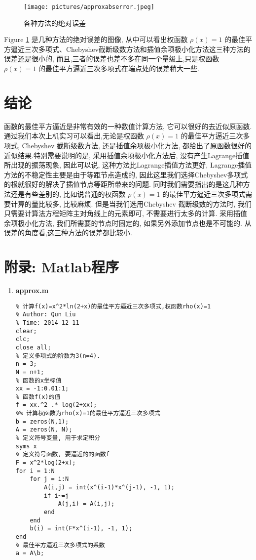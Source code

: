 \documentclass[a4paper]{article}
\begin{document}
\begin{spacing}{1.5}
\begin{CJK*}{GBK}{song}
\begin{figure}[!htbp]
\centering\texttt{[image: pictures/approxabserror.jpeg]}
\setlength{\abovecaptionskip}{0pt}
\caption{各种方法的绝对误差}\label{fig_err}
\setlength{\belowcaptionskip}{0pt}
\end{figure}
Figure \ref{fig_err} 是几种方法的绝对误差的图像, 从中可以看出权函数 $\rho(x)=1$ 的最佳平方逼近三次多项式、Chebyshev截断级数方法和插值余项极小化方法这三种方法的误差还是很小的, 而且,三者的误差也差不多在同一个量级上,只是权函数 $\rho(x)=1$ 的最佳平方逼近三次多项式在端点处的误差稍大一些.

\section{结论}
函数的最佳平方逼近是非常有效的一种数值计算方法, 它可以很好的去近似原函数. 通过我们本次上机实习可以看出,无论是权函数 $\rho(x)=1$ 的最佳平方逼近三次多项式, Chebyshev 截断级数方法, 还是插值余项极小化方法, 都给出了原函数很好的近似结果.特别需要说明的是, 采用插值余项极小化方法后, 没有产生Lagrange插值所出现的振荡现象, 因此可以说, 这种方法比Lagrange插值方法更好, Lagrange插值方法的不稳定性主要是由于等距节点造成的, 因此这里我们选择Chebyshev多项式的根就很好的解决了插值节点等距所带来的问题. 同时我们需要指出的是这几种方法还是有些差别的, 比如说普通的权函数 $\rho(x)=1$ 的最佳平方逼近三次多项式需要计算的量比较多, 比较麻烦. 但是当我们选用Chebyshev 截断级数的方法时, 我们只需要计算法方程矩阵主对角线上的元素即可, 不需要进行太多的计算. 采用插值余项极小化方法, 我们所需要的节点时固定的, 如果另外添加节点也是不可能的. 从误差的角度看,这三种方法的误差都比较小.

\section{附录: Matlab程序}
\begin{scriptsize}
\begin{enumerate}[(1)]
\item \textbf{approx.m} \\
\begin{lstlisting}
% 计算f(x)=x^2*ln(2+x)的最佳平方逼近三次多项式,权函数rho(x)=1
% Author: Qun Liu
% Time: 2014-12-11
clear;
clc;
close all;
% 定义多项式的阶数为3(n=4).
n = 3;
N = n+1;
% 函数的x坐标值
xx = -1:0.01:1;
% 函数f(x)的值
f = xx.^2 .* log(2+xx);
%% 计算权函数为rho(x)=1的最佳平方逼近三次多项式
b = zeros(N,1);
A = zeros(N, N);
% 定义符号变量, 用于求定积分
syms x
% 定义符号函数, 要逼近的的函数f
F = x^2*log(2+x);
for i = 1:N
    for j = i:N
        A(i,j) = int(x^(i-1)*x^(j-1), -1, 1);
        if i~=j
        	A(j,i) = A(i,j);
        end
    end
    b(i) = int(F*x^(i-1), -1, 1);
end
% 最佳平方逼近三次多项式的系数
a = A\b;


\end{lstlisting}
\end{enumerate}
\end{scriptsize}
\end{CJK*}
\end{spacing}
\end{document}
